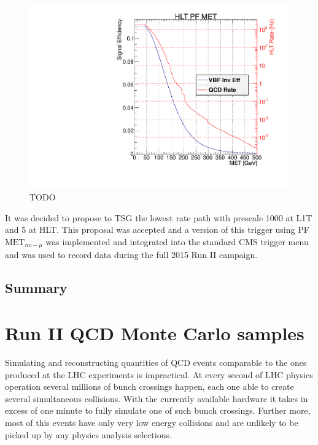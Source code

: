 \begin{figure}[!htp]%
\centering
\includegraphics[width=0.55\linewidth]{Chapter08/TriggerStudies/HLT/Systematics/L1ETM50_HLT_DijetVBF40_DEta3p5_MJJ600.pdf}
\caption{TODO}
\label{FIGURE:RunIITriggerStudies_SystematicsPath}
\end{figure}

It was decided to propose to \gls{TSG} the lowest rate path with prescale 1000 at \gls{L1T} and 5 at \gls{HLT}. This proposal was accepted and a version of this trigger using \gls{PF} $\text{MET}_{no-\mu}$ was implemented and integrated into the standard \gls{CMS} trigger menu and was used to record data during the full 2015 Run II campaign.

\subsection{Summary}
\label{SUBSECTION:RunIIPreparation_Summary}






\section{Run II QCD Monte Carlo samples}
\label{SECTION:RunIIPreparation_RunIIQCDMonteCarloSamples}


Simulating and reconstructing quantities of \gls{QCD} events comparable to the ones produced at the \gls{LHC} experiments is impractical. At every second of \gls{LHC} physics operation several millions of bunch crossings happen, each one able to create several simultaneous collisions. With the currently available hardware it takes in excess of one minute to fully simulate one of such bunch crossings. Further more, most of this events have only very low energy collisions and are unlikely to be picked up by any physics analysis selections.  

